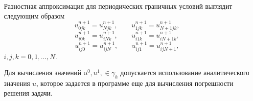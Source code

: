 Разностная аппроксимация для периодических граничных условий выглядит следующим образом
\[
    u^{n+1}_{0jk}=u^{n+1}_{Njk},
    \qquad
    u^{n+1}_{1jk}=u^{n+1}_{N+1jk},
\]
\[
    u^{n+1}_{i0k}=u^{n+1}_{iNk},
    \qquad
    u^{n+1}_{i1k}=u^{n+1}_{iN+1k},
\]
\[
    u^{n+1}_{ij0}=u^{n+1}_{ijN},
    \qquad
    u^{n+1}_{ij1}=u^{n+1}_{ijN+1},
\]
\(i,j,k=0,1,\dots,N\).

Для вычисления значений \(u^0, u^1, \in \gamma_{h}\) допускается использование аналитического значения \(u\), которое задается в программе еще для вычисления погрешности решения задачи.
